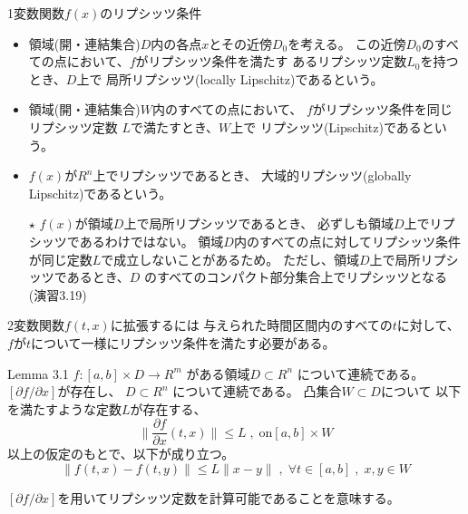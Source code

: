 \documentclass{jsarticle}
\begin{document}


1変数関数$f(x)$のリプシッツ条件

\begin{itemize}
  \item 領域(開・連結集合)$D$内の各点$x$とその近傍$D_0$を考える。
この近傍$D_0$のすべての点において、$f$がリプシッツ条件を満たす
あるリプシッツ定数$L_0$を持つとき、$D$上で
局所リプシッツ(locally Lipschitz)であるという。

\item 領域(開・連結集合)$W$内のすべての点において、
$f$がリプシッツ条件を同じリプシッツ定数
$L$で満たすとき、$W$上で
リプシッツ(Lipschitz)であるという。

\item $f(x)$が$R^n$上でリプシッツであるとき、
大域的リプシッツ(globally Lipschitz)であるという。

\item[$\star$] $f(x)$が領域$D$上で局所リプシッツであるとき、
必ずしも領域$D$上でリプシッツであるわけではない。
領域$D$内のすべての点に対してリプシッツ条件が同じ定数$L$で成立しないことがあるため。
ただし、領域$D$上で局所リプシッツであるとき、$D$
のすべてのコンパクト部分集合上でリプシッツとなる(演習3.19)
\end{itemize}

2変数関数$f(t,x)$に拡張するには
与えられた時間区間内のすべての$t$に対して、
$f$が$t$について一様にリプシッツ条件を満たす必要がある。

\begin{itembox}[l]{Lemma 3.1}
  $f:[a,b]\times D\rightarrow R^m$
  がある領域$D \subset R^n$
  について連続である。
  $[\partial f/\partial x]$が存在し、
  $D \subset R^n$
  について連続である。
  凸集合$W\subset D$について
  以下を満たすような定数$L$が存在する、
  \begin{equation*}
    \|\frac{\partial f}{\partial x}(t,x)\|\leq L \;,\; \text{on} 
    [a,b]\times W 
  \end{equation*}
  以上の仮定のもとで、以下が成り立つ。
  \begin{equation*}
    \|f(t,x)-f(t,y)\| \leq L\|x-y\| \;,\; 
    \forall t\in [a,b]\;,\; x,y\in W 
  \end{equation*}
  
\end{itembox}
$[\partial f/\partial x]$を用いてリプシッツ定数を計算可能であることを意味する。
\end{document}
